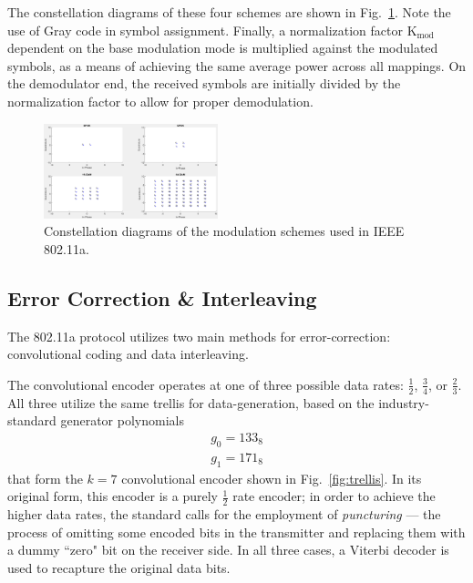 \documentclass[journal]{IEEEtran}
\begin{document}
The constellation diagrams of these four schemes are shown in Fig.~\ref{fig:Constellations}. Note the use of Gray code in symbol assignment. Finally, a normalization factor $\text{K}_\text{mod}$ dependent on the base modulation mode is multiplied against the modulated symbols, as a means of achieving the same average power across all mappings. On the demodulator end, the received symbols are initially divided by the normalization factor to allow for proper demodulation.
\begin{figure}
    \centering
    \includegraphics[width = 0.45\textwidth]{Modulation}
    \caption{Constellation diagrams of the modulation schemes used in IEEE 802.11a.}
    \label{fig:Constellations}
\end{figure}

\subsection{Error Correction \& Interleaving} \label{sec:ErrorCorrect}
The 802.11a protocol utilizes two main methods for error-correction: convolutional coding and data interleaving. 

The convolutional encoder operates at one of three possible data rates: $\frac{1}{2}$, $\frac{3}{4}$, or $\frac{2}{3}$. All three  utilize the same trellis for data-generation, based on the industry-standard generator polynomials
\begin{eqnarray}
\nonumber g_0 = 133_8 \\
\nonumber g_1 = 171_8
\end{eqnarray}
that form the $k=7$ convolutional encoder shown in Fig.~\ref{fig:trellis}. In its original form, this encoder is a purely $\frac{1}{2}$ rate encoder; in order to achieve the higher data rates, the standard calls for the employment of \emph{puncturing} --- the process of omitting some encoded bits in the transmitter and replacing them with a dummy ``zero" bit on the receiver side. In all three cases, a Viterbi decoder is used to recapture the original data bits.
\end{document}
